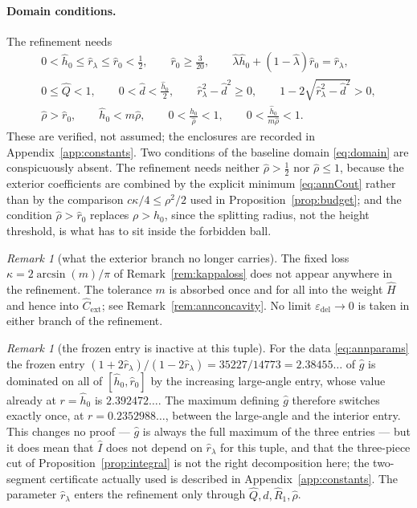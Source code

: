 \documentclass[11pt]{article}
\theoremstyle{plain}
\theoremstyle{definition}
\theoremstyle{remark}
\newtheorem{remark}[theorem]{Remark}
\newcommand{\epsdel}{\varepsilon_{\mathrm{del}}}
\begin{document}
\paragraph{Domain conditions.} The refinement needs
\begin{equation}\label{eq:anndomain}
\begin{gathered}
  0<\hat h_{0}\le\hat r_{\lambda}\le\hat r_{0}<\tfrac12,\qquad
  \hat r_{0}\ge\tfrac{3}{20},\qquad
  \hat\lambda\hat h_{0}+(1-\hat\lambda)\hat r_{0}=\hat r_{\lambda},\\
  0\le\hat Q<1,\qquad 0<\hat d<\tfrac{\hat h_{0}}{2},\qquad
  \hat r_{\lambda}^{2}-\hat d^{2}\ge0,\qquad
  1-2\sqrt{\hat r_{\lambda}^{2}-\hat d^{2}}>0,\\
  \hat\rho>\hat r_{0},\qquad \hat h_{0}<m\hat\rho,\qquad
  0<\frac{\hat h_{0}}{\hat\rho}<1,\qquad
  0<\frac{\hat h_{0}}{m\hat\rho}<1 .
\end{gathered}
\end{equation}
These are verified, not assumed; the enclosures are recorded in
Appendix~\ref{app:constants}. Two conditions of the baseline domain
\eqref{eq:domain} are conspicuously absent. The refinement needs neither
$\hat\rho>\tfrac12$ nor $\hat\rho\le1$, because the exterior coefficients are
combined by the explicit minimum \eqref{eq:annCout} rather than by the
comparison $c\kappa/4\le\rho^{2}/2$ used in Proposition~\ref{prop:budget}; and
the condition $\hat\rho>\hat r_{0}$ replaces $\rho>h_{0}$, since the splitting
radius, not the height threshold, is what has to sit inside the forbidden ball.

\begin{remark}[what the exterior branch no longer carries]\label{rem:annnokappa}
The fixed loss $\kappa=2\arcsin(m)/\pi$ of Remark~\ref{rem:kappaloss} does not
appear anywhere in the refinement. The tolerance $m$ is absorbed once and for
all into the weight $\hat H$ and hence into $\hat C_{\mathrm{ext}}$; see
Remark~\ref{rem:annconcavity}. No limit $\epsdel\to0$ is taken in either
branch of the refinement.
\end{remark}

\begin{remark}[the frozen entry is inactive at this tuple]\label{rem:annfrozen}
For the data \eqref{eq:annparams} the frozen entry
$(1+2\hat r_{\lambda})/(1-2\hat r_{\lambda})=35227/14773=2.38455\ldots$ of
$\hat g$ is dominated on all of $[\hat h_{0},\hat r_{0}]$ by the increasing
large-angle entry, whose value already at $r=\hat h_{0}$ is
$2.392472\ldots$. The maximum defining $\hat g$ therefore switches exactly
once, at $r=0.2352988\ldots$, between the large-angle and the interior entry.
This changes no proof --- $\hat g$ is always the full maximum of the three
entries --- but it does mean that $\hat I$ does not depend on $\hat
r_{\lambda}$ for this tuple, and that the three-piece cut of
Proposition~\ref{prop:integral} is not the right decomposition here; the
two-segment certificate actually used is described in
Appendix~\ref{app:constants}. The parameter $\hat r_{\lambda}$ enters the
refinement only through $\hat Q,\hat d,\hat R_{1},\hat\rho$.
\end{remark}
\end{document}
